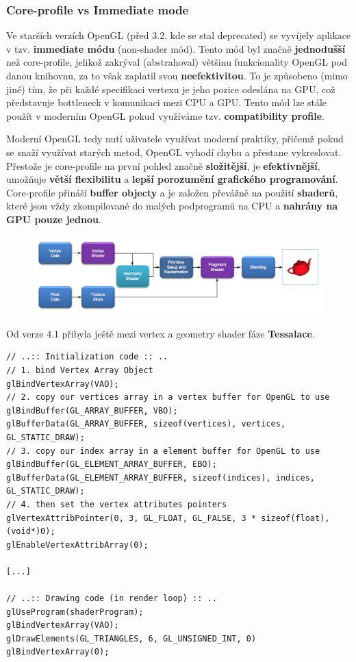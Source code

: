 \subsubsection{Core-profile vs Immediate mode}
Ve starších verzích OpenGL (před 3.2, kde se stal deprecated) se vyvíjely aplikace v tzv. \textbf{immediate módu} (non-shader mód). Tento mód byl značně \textbf{jednodušší} než core-profile, jelikož zakrýval (abstrahoval) většinu funkcionality OpenGL pod danou knihovnu, za to však zaplatil svou \textbf{neefektivitou}. To je způsobeno (mimo jiné) tím, že při každé specifikaci vertexu je jeho pozice odeslána na GPU, což představuje bottleneck v komunikaci mezi CPU a GPU. Tento mód lze stále použít v moderním OpenGL pokud využíváme tzv. \textbf{compatibility profile}.

Moderní OpenGL tedy nutí uživatele využívat moderní praktiky, přičemž pokud se snaží využívat starých metod, OpenGL vyhodí chybu a přestane vykreslovat. Přestože je core-profile na první pohled značně \textbf{složitější}, je \textbf{efektivnější}, umožňuje \textbf{větší flexibilitu} a \textbf{lepší porozumění grafického programování}. Core-profile přináší \textbf{buffer objecty} a je založen převážně na použití \textbf{shaderů}, které jsou vždy zkompilované do malých podprogramů na CPU a \textbf{nahrány na GPU pouze jednou}.

\begin{figure}[H]
	\centering
	\includegraphics[width=\textwidth]{assets/5_opengl_pipe}
\end{figure}

Od verze 4.1 přibyla ještě mezi vertex a geometry shader fáze \textbf{Tessalace}.

\begin{verbatim}
// ..:: Initialization code :: ..
// 1. bind Vertex Array Object
glBindVertexArray(VAO);
// 2. copy our vertices array in a vertex buffer for OpenGL to use
glBindBuffer(GL_ARRAY_BUFFER, VBO);
glBufferData(GL_ARRAY_BUFFER, sizeof(vertices), vertices, GL_STATIC_DRAW);
// 3. copy our index array in a element buffer for OpenGL to use
glBindBuffer(GL_ELEMENT_ARRAY_BUFFER, EBO);
glBufferData(GL_ELEMENT_ARRAY_BUFFER, sizeof(indices), indices, GL_STATIC_DRAW);
// 4. then set the vertex attributes pointers
glVertexAttribPointer(0, 3, GL_FLOAT, GL_FALSE, 3 * sizeof(float), (void*)0);
glEnableVertexAttribArray(0);  

[...]

// ..:: Drawing code (in render loop) :: ..
glUseProgram(shaderProgram);
glBindVertexArray(VAO);
glDrawElements(GL_TRIANGLES, 6, GL_UNSIGNED_INT, 0)
glBindVertexArray(0);
\end{verbatim}

